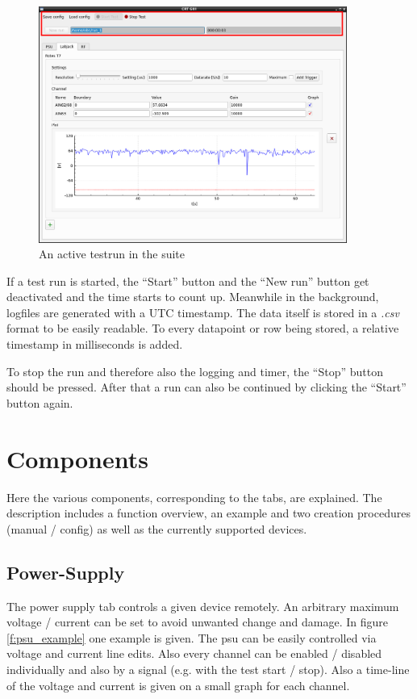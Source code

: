 \documentclass[10pt,a4paper]{article}
\begin{document}
	\begin{figure}[H]
\centering
\includegraphics[width=0.9\textwidth]{./4_Testrun.png}
\caption{An active testrun in the suite}
	\end{figure}
	
	If a test run is started, the \enquote{Start} button and the \enquote{New run} button get deactivated and the time starts to count up. Meanwhile in the background, logfiles are generated with a UTC timestamp. The data itself is stored in a \textit{.csv} format to be easily readable. To every datapoint or row being stored, a relative timestamp in milliseconds is added.
	
	\bigbreak
	
	To stop the run and therefore also the logging and timer, the \enquote{Stop} button should be pressed. After that a run can also be continued by clicking the \enquote{Start} button again.	
	
\newpage
	
\section{Components}
Here the various components, corresponding to the tabs, are explained. The description includes a function overview, an example and two creation procedures (manual / config) as well as the currently supported devices.

	\subsection{Power-Supply}
	The power supply tab controls a given device remotely. An arbitrary maximum voltage / current can be set to avoid unwanted change and damage. In figure \eqref{f:psu_example} one example is given. The psu can be easily controlled via voltage and current line edits. Also every channel can be enabled / disabled individually and also by a signal (e.g. with the test start / stop). Also a time-line of the voltage and current is given on a small graph for each channel. 	
	
\end{document}
